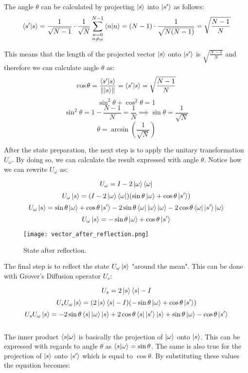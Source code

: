 \documentclass[12pt,a4paper]{report}
\begin{document}
\newpage

\noindent
The angle $\theta$ can be calculated by projecting $\ket{s}$ into $\ket{s'}$ as follows:
\[
\braket{s'|s} = \frac{1}{\sqrt{N-1}} \cdot \frac{1}{\sqrt{N}} \sum_{\substack{n=0 \\ n \neq \omega}}^{N-1} \braket{n|n} = (N-1) \cdot \frac{1}{\sqrt{N(N-1)}} = \sqrt{\frac{N-1}{N}}
\]

\noindent
This means that the length of the projected vector $\ket{s}$ onto $\ket{s'}$ is $\sqrt{\frac{N-1}{N}}$ and therefore we can calculate angle $\theta$ as:
\[
\cos \theta = \frac{\braket{s'|s}}{\lVert \ket{s} \rVert} = \braket{s'|s} = \sqrt{\frac{N-1}{N}}
\]
\[
\sin^2 \theta + \cos^2 \theta = 1
\]
\[
\sin^2 \theta = 1 - \frac{N-1}{N} = \frac{1}{N} \implies \sin \theta = \frac{1}{\sqrt{N}}
\]
\[
\theta = \arcsin \left( \frac{1}{\sqrt{N}} \right)
\]

\noindent
After the state preparation, the next step is to apply the unitary transformation \( U_\omega \). By doing so, we can calculate the result expressed with angle \(\theta\). Notice how we can rewrite \( U_\omega \) as:

\[
U_\omega = I - 2 \ket{\omega}\bra{\omega}
\]
\[
U_\omega \ket{s} = (I - 2\ket{\omega}\bra{\omega}) (\sin \theta \ket{\omega} + \cos \theta \ket{s'})
\]
\[
U_\omega \ket{s} = \sin \theta \ket{\omega} + \cos \theta \ket{s'} - 2\sin \theta \bra{\omega}\ket{\omega} \ket{\omega} - 2\cos \theta \bra{\omega}\ket{s'} \ket{\omega}
\]
\[
U_\omega \ket{s} = -\sin \theta \ket{\omega} + \cos \theta \ket{s'}
\]

\begin{figure}[!h]
    \centering
    \texttt{[image: vector\_after\_reflection.png]}
    \caption{State after reflection.}
    \label{fig:grov_after_refl}
\end{figure}

\newpage

\noindent
The final step is to reflect the state \( U_\omega \ket{s} \) "around the mean". This can be done with Grover's Diffusion operator \( U_s \):

\[
U_s = 2\ket{s}\bra{s} - I
\]
\[
U_s U_\omega \ket{s} = (2\ket{s}\bra{s} - I) (-\sin \theta \ket{\omega} + \cos \theta \ket{s'})
\]
\[
U_s U_\omega \ket{s} = -2 \sin \theta \bra{s}\ket{\omega} \ket{s} + 2 \cos \theta \bra{s}\ket{s'} \ket{s} + \sin \theta \ket{\omega} - \cos \theta \ket{s'}
\]
\\

\noindent
The inner product \( \braket{s|\omega} \) is basically the projection of \( \ket{\omega} \) onto \( \ket{s} \). This can be expressed with regards to angle \( \theta \) as \( \braket{s|\omega} = \sin \theta \). The same is also true for the projection of \( \ket{s} \) onto \( \ket{s'} \) which is equal to \( \cos \theta \). By substituting these values the equation becomes:
\end{document}
